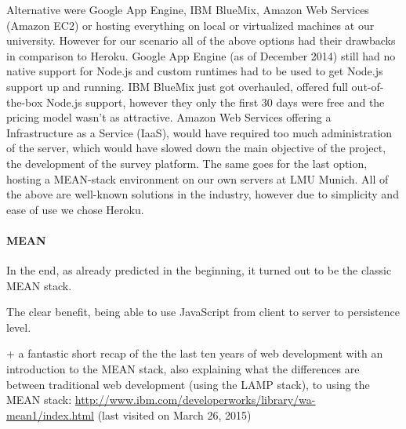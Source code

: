 


		Alternative were Google App Engine, IBM BlueMix, Amazon Web Services (Amazon EC2) or hosting everything on local or virtualized machines at our university. However for our scenario all of the above options had their drawbacks in comparison to Heroku. Google App Engine (as of December 2014) still had no native support for Node.js and custom runtimes had to be used to get Node.js support up and running. IBM BlueMix just got overhauled, offered full out-of-the-box Node.js support, however they only the first 30 days were free and the pricing model wasn't as attractive. Amazon Web Services offering a Infrastructure as a Service (IaaS), would have required too much administration of the server, which would have slowed down the main objective of the project, the development of the survey platform. The same goes for the last option, hosting a MEAN-stack environment on our own servers at LMU Munich. All of the above are well-known solutions in the industry, however due to simplicity and ease of use we chose Heroku.




		\paragraph{MEAN}
			In the end, as already predicted in the beginning, it turned out to be the classic MEAN stack. 

			The clear benefit, being able to use JavaScript from client to server to persistence level. 


			+ a fantastic short recap of the the last ten years of web development with an introduction to the MEAN stack, also explaining what the differences are between traditional web development (using the LAMP stack), to using the MEAN stack:
			\url{http://www.ibm.com/developerworks/library/wa-mean1/index.html} (last visited on March 26, 2015)



\clearpage

\label{sec:implementation:modeling}





